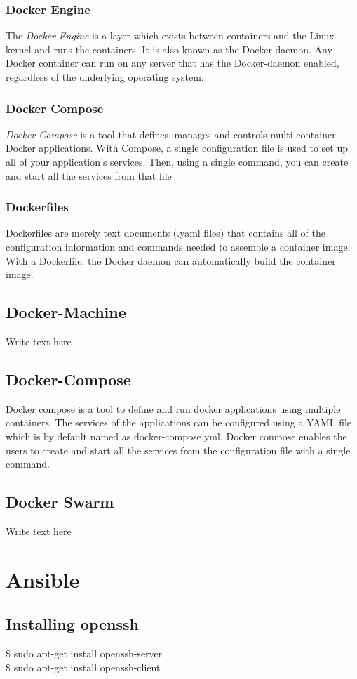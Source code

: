 \documentclass[12pt]{article}
\begin{document}
\subsubsection{Docker Engine}
The \textit{Docker Engine} is a layer which exists between containers and the Linux kernel and runs the containers. It is also known as the Docker daemon. Any Docker container can run on any server that has the Docker-daemon enabled, regardless of the underlying operating system.
\subsubsection{Docker Compose}
\textit{Docker Compose} is a tool that defines, manages and controls multi-container Docker applications. With Compose, a single configuration file is used to set up all of your application’s services. Then, using a single command, you can create and start all the services from that file
\subsubsection{Dockerfiles}
Dockerfiles are merely text documents (.yaml files) that contains all of the configuration information and commands needed to assemble a container image. With a Dockerfile, the Docker daemon can automatically build the container image.
\subsection{Docker-Machine}
Write text here
\subsection{Docker-Compose}
Docker compose is a tool to define and run docker applications using multiple containers. The services of the applications can be configured using a YAML file which is by default named as docker-compose.yml. Docker compose enables the users to create and start all the services from the configuration file with a single command.
\subsection{Docker Swarm}
Write text here
\section{Ansible}
\subsection{Installing openssh}
\$ sudo apt-get install openssh-server\\
\$ sudo apt-get install openssh-client
\end{document}
